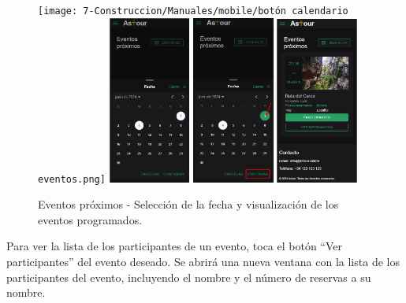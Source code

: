 \begin{figure}[H]
	\centering
	\texttt{[image: 7-Construccion/Manuales/mobile/botón calendario eventos.png]}
	\includegraphics[width=0.24\textwidth]{7-Construccion/Manuales/mobile/calendario eventos.png}
	\includegraphics[width=0.24\textwidth]{7-Construccion/Manuales/mobile/seleccion dia eventos.png}
	\includegraphics[width=0.24\textwidth]{7-Construccion/Manuales/mobile/eventos.png}
	\caption{Eventos próximos - Selección de la fecha y visualización de los eventos programados.}
\end{figure}
Para ver la lista de los participantes de un evento, toca el botón “Ver participantes” del evento deseado.
Se abrirá una nueva ventana con la lista de los participantes del evento, incluyendo el nombre y el número de reservas a su nombre.
